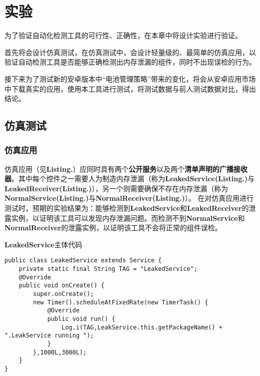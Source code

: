 
\chapter{实验}\label{chapter_experiment}
为了验证自动化检测工具的可行性、正确性，在本章中将设计实验进行验证。

首先将会设计仿真测试，在仿真测试中，会设计轻量级的、最简单的仿真应用，以验证自动检测工具是否能够正确检测出内存泄漏的组件，同时不出现误检的行为。

接下来为了测试新的安卓版本中“电池管理策略”带来的变化，将会从安卓应用市场中下载真实的应用，使用本工具进行测试，将测试数据与前人测试数据对比，得出结论。
\section{仿真测试}

\subsection{仿真应用}

仿真应用（见\textbf{Listing.}\redbf{\ref{code: manifest}}）应同时具有两个\textbf{公开服务}以及两个\textbf{清单声明的广播接收器}。其中每个控件之一需要人为制造内存泄漏（称为\textbf{LeakedService(Listing.\redbf{\ref{code:LeakedService}})}与\textbf{LeakedReceiver(Listing.\redbf{\ref{code:LeakedReceiver}})}），另一个则需要确保不存在内存泄漏（称为\textbf{NormalService(Listing.\redbf{\ref{code:Normal}})}与\textbf{NormalReceiver(Listing.\redbf{\ref{code:Normal}})}）。
在对仿真应用进行测试时，预期的实验结果为：能够检测到\textbf{LeakedService}和\textbf{LeakedReceiver}的泄露实例，以证明该工具可以发现内存泄漏问题。而检测不到\textbf{NormalService}和\textbf{NormalReceiver}的泄露实例，以证明该工具不会将正常的组件误检。


\begin{listing}[htbp]
	\centering
	\caption{\textbf{LeakedService}主体代码}
	\begin{verbatim}
public class LeakedService extends Service {
	private static final String TAG = "LeakedService";
	@Override
	public void onCreate() {
		super.onCreate();
		new Timer().scheduleAtFixedRate(new TimerTask() {
			@Override
			public void run() {
				Log.i(TAG,LeakService.this.getPackageName() + ".LeakService running ");
			}
		},1000L,3000L);
	}
}	
	\end{verbatim}
	\label{code:LeakedService}
\end{listing}

